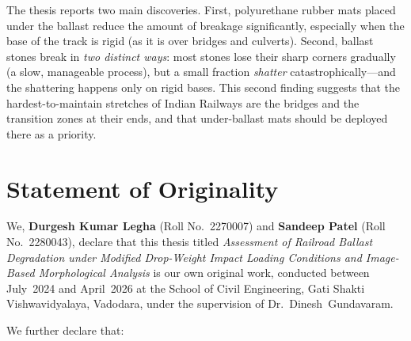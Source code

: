 \bigskip

The thesis reports two main discoveries. First, polyurethane rubber
mats placed under the ballast reduce the amount of breakage
significantly, especially when the base of the track is rigid (as it
is over bridges and culverts). Second, ballast stones break in
\emph{two distinct ways}: most stones lose their sharp corners
gradually (a slow, manageable process), but a small fraction
\emph{shatter} catastrophically---and the shattering happens only on
rigid bases. This second finding suggests that the
hardest-to-maintain stretches of Indian Railways are the bridges and
the transition zones at their ends, and that under-ballast mats
should be deployed there as a priority.

\endgroup

\cleardoublepage
\chapter*{Statement of Originality}
\thispagestyle{plain}

\begingroup
\setlength{\parindent}{0pt}

We, \textbf{Durgesh Kumar Legha} (Roll No.\ 2270007) and
\textbf{Sandeep Patel} (Roll No.\ 2280043), declare that this thesis
titled \emph{Assessment of Railroad Ballast Degradation under Modified
Drop-Weight Impact Loading Conditions and Image-Based Morphological
Analysis} is our own original work, conducted between July~2024 and
April~2026 at the School of Civil Engineering, Gati Shakti
Vishwavidyalaya, Vadodara, under the supervision of
Dr.~Dinesh~Gundavaram.

\bigskip

We further declare that:

